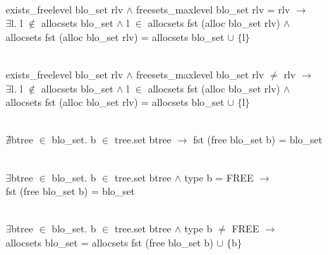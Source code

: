 \begin{definition}  \\
exists\_freelevel blo\_set rlv $\wedge$ freesets\_maxlevel blo\_set rlv = rlv $\longrightarrow$ \\
\phantom{x} \hspace{10pt} $\exists$l. l $\notin$ allocsets blo\_set $\wedge$ l $\in$ allocsets fst (alloc blo\_set rlv) $\wedge$ \\
\phantom{x} \hspace{10pt} allocsets fst (alloc blo\_set rlv) = allocsets blo\_set $\cup$ $\lbrace$l$\rbrace$
\label{pp3}
\end{definition}

\begin{definition}  \\
exists\_freelevel blo\_set rlv $\wedge$ freesets\_maxlevel blo\_set rlv $\neq$ rlv $\longrightarrow$ \\
\phantom{x} \hspace{10pt} $\exists$l. l $\notin$ allocsets blo\_set $\wedge$ l $\in$ allocsets fst (alloc blo\_set rlv) $\wedge$ \\
\phantom{x} \hspace{10pt} allocsets fst (alloc blo\_set rlv) = allocsets blo\_set $\cup$ $\lbrace$l$\rbrace$
\label{pp4}
\end{definition}

\begin{definition}  \\
$\nexists$btree $\in$ blo\_set. b $\in$ tree.set btree $\longrightarrow$ fst (free blo\_set b) = blo\_set
\label{pp5}
\end{definition}

\begin{definition}  \\
$\exists$btree $\in$ blo\_set. b $\in$ tree.set btree $\wedge$ type b = FREE $\longrightarrow$ \\
\phantom{x} \hspace{10pt} fst (free blo\_set b) = blo\_set
\label{pp6}
\end{definition}

\begin{definition}  \\
$\exists$btree $\in$ blo\_set. b $\in$ tree.set btree $\wedge$ type b $\neq$ FREE $\longrightarrow$ \\
\phantom{x} \hspace{10pt} allocsets blo\_set = allocsets fst (free blo\_set b) $\cup$ $\lbrace$b$\rbrace$
\label{pp7}
\end{definition}

